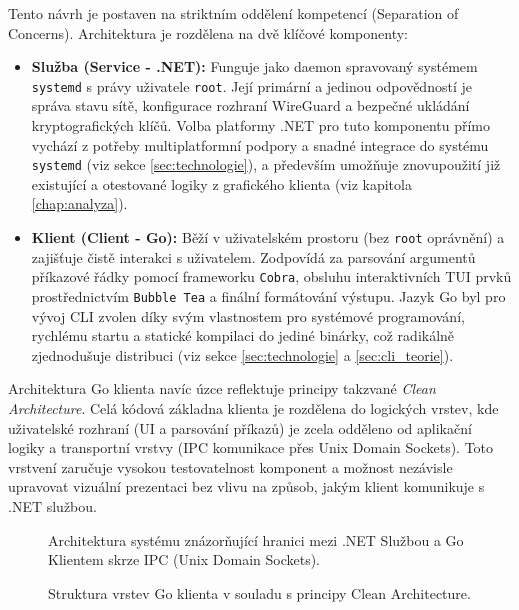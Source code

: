 Tento návrh je postaven na striktním oddělení kompetencí (Separation of Concerns). Architektura je rozdělena na dvě klíčové komponenty:
\begin{itemize}
    \item \textbf{Služba (Service - .NET):} Funguje jako daemon spravovaný systémem \texttt{systemd} s právy uživatele \texttt{root}. Její primární a jedinou odpovědností je správa stavu sítě, konfigurace rozhraní WireGuard a bezpečné ukládání kryptografických klíčů. Volba platformy .NET pro tuto komponentu přímo vychází z potřeby multiplatformní podpory a snadné integrace do systému \texttt{systemd} (viz sekce \ref{sec:technologie}), a především umožňuje znovupoužití již existující a otestované logiky z grafického klienta (viz kapitola \ref{chap:analyza}).
    \item \textbf{Klient (Client - Go):} Běží v uživatelském prostoru (bez \texttt{root} oprávnění) a zajišťuje čistě interakci s uživatelem. Zodpovídá za parsování argumentů příkazové řádky pomocí frameworku \texttt{Cobra}, obsluhu interaktivních TUI prvků prostřednictvím \texttt{Bubble Tea} a finální formátování výstupu. Jazyk Go byl pro vývoj CLI zvolen díky svým vlastnostem pro systémové programování, rychlému startu a statické kompilaci do jediné binárky, což radikálně zjednodušuje distribuci (viz sekce \ref{sec:technologie} a \ref{sec:cli_teorie}).
\end{itemize}

Architektura Go klienta navíc úzce reflektuje principy takzvané \textit{Clean Architecture}. Celá kódová základna klienta je rozdělena do logických vrstev, kde uživatelské rozhraní (UI a parsování příkazů) je zcela odděleno od aplikační logiky a transportní vrstvy (IPC komunikace přes Unix Domain Sockets). Toto vrstvení zaručuje vysokou testovatelnost komponent a možnost nezávisle upravovat vizuální prezentaci bez vlivu na způsob, jakým klient komunikuje s .NET službou.

\begin{figure}[!htbp]
    \centering
    \vspace{4cm} %
    \caption{Architektura systému znázorňující hranici mezi .NET Službou a Go Klientem skrze IPC (Unix Domain Sockets).}
    \label{fig:architecture_ipc}
\end{figure}

\begin{figure}[!htbp]
    \centering
    \vspace{4cm} %
    \caption{Struktura vrstev Go klienta v souladu s principy Clean Architecture.}
    \label{fig:clean_architecture_go}
\end{figure}
